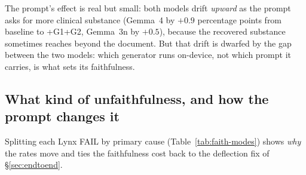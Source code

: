 The prompt's effect is real but small: both models drift \emph{upward} as the
prompt asks for more clinical substance (Gemma~4 by $+0.9$ percentage points
from baseline to \mbox{+G1+G2}, Gemma~3n by $+0.5$), because the recovered
substance sometimes reaches beyond the document. But that drift is dwarfed by
the gap between the two models: which generator runs on-device, not which
prompt it carries, is what sets its faithfulness.

\subsection{What kind of unfaithfulness, and how the prompt changes it}
\label{sec:faith-modes}

Splitting each Lynx FAIL by primary cause (Table~\ref{tab:faith-modes}) shows
\emph{why} the rates move and ties the faithfulness cost back to the
deflection fix of \S\ref{sec:endtoend}.

